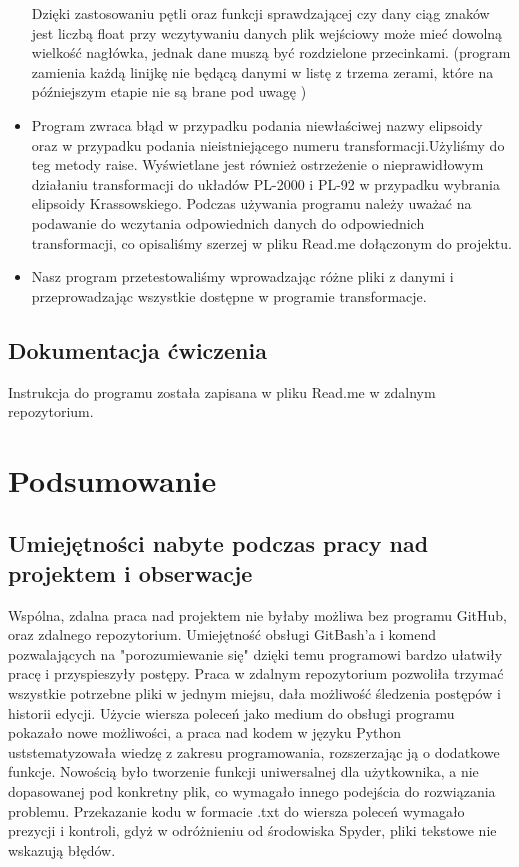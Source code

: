\documentclass[10pt,a4paper]{article}
\begin{document}
\begin{itemize}
	Dzięki zastosowaniu pętli oraz funkcji sprawdzającej czy dany ciąg znaków jest liczbą float przy wczytywaniu danych plik wejściowy może mieć dowolną wielkość nagłówka, jednak dane muszą być rozdzielone przecinkami. (program zamienia każdą linijkę nie będącą danymi w listę z trzema zerami, które na późniejszym etapie nie są brane pod uwagę )
	\item Program zwraca błąd w przypadku podania niewłaściwej nazwy elipsoidy oraz w przypadku podania nieistniejącego numeru transformacji.Użyliśmy do teg metody raise. Wyświetlane jest również ostrzeżenie o nieprawidłowym działaniu transformacji do układów PL-2000 i PL-92 w przypadku wybrania elipsoidy Krassowskiego. Podczas używania programu należy uważać na podawanie do wczytania odpowiednich danych do odpowiednich transformacji, co opisaliśmy szerzej w pliku Read.me dołączonym do projektu.
	\item Nasz program przetestowaliśmy wprowadzając różne pliki z danymi i przeprowadzając wszystkie dostępne w programie transformacje.
\end{itemize}
\subsection{Dokumentacja ćwiczenia}
Instrukcja do programu została zapisana w pliku Read.me w zdalnym repozytorium.
\section{Podsumowanie}
\subsection{Umiejętności nabyte podczas pracy nad projektem i obserwacje}
Wspólna, zdalna praca nad projektem nie byłaby możliwa bez programu GitHub, oraz zdalnego repozytorium. Umiejętność obsługi GitBash'a i komend pozwalających na "porozumiewanie się" dzięki temu programowi bardzo ułatwiły pracę i przyspieszyły postępy. Praca w zdalnym repozytorium pozwoliła trzymać wszystkie potrzebne pliki w jednym miejsu, dała możliwość śledzenia postępów i historii edycji.
\newline 
Użycie wiersza poleceń jako medium do obsługi programu pokazało nowe możliwości, a praca nad kodem w języku Python uststematyzowała wiedzę z zakresu programowania, rozszerzając ją o dodatkowe funkcje. Nowością było tworzenie funkcji uniwersalnej dla użytkownika, a nie dopasowanej pod konkretny plik, co wymagało innego podejścia do rozwiązania problemu. Przekazanie kodu w formacie .txt do wiersza poleceń wymagało prezycji i kontroli, gdyż w odróżnieniu od środowiska Spyder, pliki tekstowe nie wskazują błędów.
\end{document}
